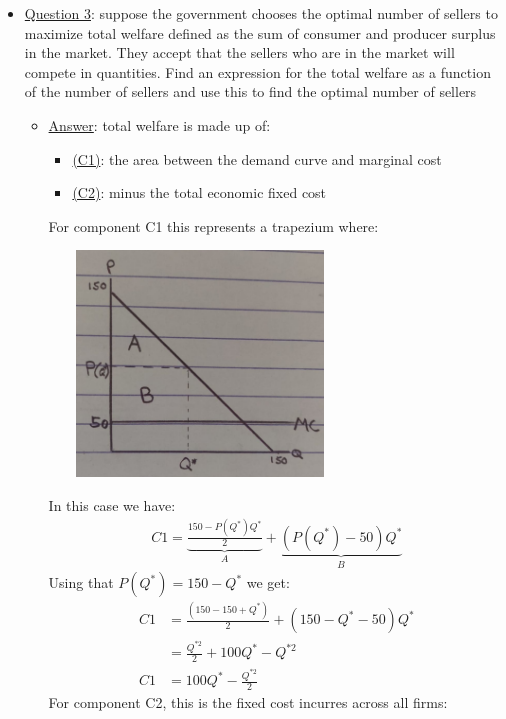 \documentclass{article}
\begin{document}
  \begin{itemize}
    \item  \underline{Question 3}: suppose the government chooses the optimal number of sellers to maximize total welfare defined as the sum of consumer and producer surplus in the market. They accept that the sellers who are in the market will compete in quantities. Find an expression for the total welfare as a function of the number of sellers and use this to find the optimal number of sellers
    \begin{itemize}
      \item  \underline{Answer}: total welfare is made up of:
      \begin{itemize}
        \item  \underline{(C1)}: the area between the demand curve and marginal cost
        \item  \underline{(C2)}: minus the total economic fixed cost
      \end{itemize}
      For component C1 this represents a trapezium where: \\
      \begin{center}
        \includegraphics[width=8cm, height=6cm]{pic31}
      \end{center}
      In this case we have:
      \begin{gather*}
        C1 = \underbrace{\frac{150-P(Q^{*})Q^{*}}{2}}_{A} + \underbrace{(P(Q^{*}) - 50)Q^{*}}_{B}
      \end{gather*}
      Using that $P(Q^{*}) = 150 - Q^{*}$ we get:
      \begin{align*}
        C1 &= \frac{(150 - 150 + Q^{*})}{2} + (150 - Q^{*} - 50)Q^{*} \\
        &= \frac{Q^{*2}}{2} + 100Q^{*} - Q^{*2} \\
        C1 &= 100Q^{*} - \frac{Q^{*2}}{2}
      \end{align*}
      For component C2, this is the fixed cost incurres across all firms:

\end{itemize}
\end{itemize}
\end{document}
